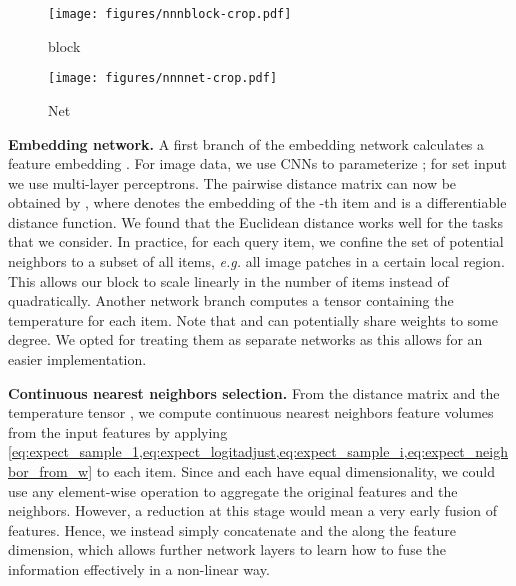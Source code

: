 \documentclass{article}
\makeatletter
\newcommand{\eg}{\emph{e.\thinspace{}g.}\@\xspace}
\newcommand{\myparagraph}[1]{\smallskip\noindent\textbf{#1}}
\makeatother
\begin{document}
\begin{figure*}[tb]
\centering
	\begin{subfigure}[b]{0.46\textwidth}
	\texttt{[image: figures/nnnblock-crop.pdf]}
	\caption{ block}
	\label{fig:overview_nnnblock}
	\end{subfigure}
	\hfill
	\begin{subfigure}[b]{0.46\textwidth}
	\texttt{[image: figures/nnnnet-crop.pdf]}
	\caption{Net}
	\label{fig:overview_nnnnet}
	\end{subfigure}
\caption{\emph{()} In a neural nearest neighbors () block (shaded box), 
an embedding network takes the output  of a previous layer 
and calculates a pairwise distance matrix  between elements in  as well as a temperature parameter (, red feature layer) for each element.
These are used to produce a stack of continuous nearest neighbors volumes  (green), 
which are then concatenated with .
We build an Net \emph{()} by interleaving common local processing networks (\eg, DnCNN \cite{Zhang:2017:BGD} or VDSR \cite{Kim:2016:VDSR})
 with  blocks.}
\label{fig:overview}
\vspace{-0.5em}
\end{figure*}




\myparagraph{Embedding network.}
A first branch of the embedding network calculates a feature embedding .
For image data, we use CNNs to parameterize ; for set input we use multi-layer perceptrons.
The pairwise distance matrix  can now be obtained by ,
where  denotes the embedding of the -th item and  is a differentiable distance function.
We found that the Euclidean distance works well for the tasks that we consider.
In practice, for each query item, we confine the set of potential neighbors to a subset of all items, \eg all image patches in a certain local region. 
This allows our  block to scale linearly in the number of items instead of quadratically.
Another network branch computes a tensor  containing the temperature  for each item.
Note that  and  can potentially share weights to some degree.
We opted for treating them as separate networks as this allows for an easier implementation.

\myparagraph{Continuous nearest neighbors selection.}
From the distance matrix  and the temperature
tensor , we compute  continuous nearest neighbors feature volumes
 from the input features  by applying
\cref{eq:expect_sample_1,eq:expect_logitadjust,eq:expect_sample_i,eq:expect_neighbor_from_w} to each item.
Since  and each  have equal dimensionality, we could use any element-wise operation to aggregate the original features  and the neighbors. 
However, a reduction at this stage would mean a very early fusion of features. 
Hence, we instead simply concatenate  and the  along the feature dimension, which allows further network layers to learn how to fuse the information effectively in a non-linear way. 
\end{document}
